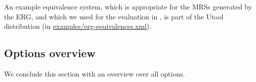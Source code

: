 An example equivalence system, which is appropriate for the MRSs
generated by the ERG, and which we used for the evaluation in
\cite{koller06}, is part of the Utool distribution (in
\url{examples/erg-equivalences.xml}). 




\subsection{Options overview}

We conclude this section with an overview over all options.

\newcommand{\optiondesc}[4]{\item #1 \\ (Server mode: #2) \\
(applies to: #3) \\ \strut\\ #4}

